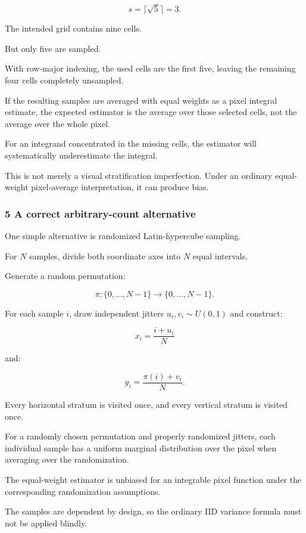\[
 s=\lceil\sqrt5\rceil=3.
\]

The intended grid contains nine cells.

But only five are sampled.

With row-major indexing, the used cells are the first five, leaving the remaining four cells completely unsampled.

If the resulting samples are averaged with equal weights as a pixel integral estimate, the expected estimator is the average over those selected cells, not the average over the whole pixel.

For an integrand concentrated in the missing cells, the estimator will systematically underestimate the integral.

This is not merely a visual stratification imperfection. Under an ordinary equal-weight pixel-average interpretation, it can produce bias.

\subsubsection{5 A correct arbitrary-count alternative}\label{02-foundations-ii-ch039-a-correct-arbitrary-count-alternative}

One simple alternative is randomized Latin-hypercube sampling.

For \(N\) samples, divide both coordinate axes into \(N\) equal intervals.

Generate a random permutation:

\[
 \pi:\{0,\ldots,N-1\}\rightarrow\{0,\ldots,N-1\}.
\]

For each sample \(i\), draw independent jitters \(u_i,v_i\sim U(0,1)\) and construct:

\[
 \boxed{ x_i=\frac{i+u_i}{N} }
\]

and:

\[
 \boxed{ y_i=\frac{\pi(i)+v_i}{N} }.
\]

Every horizontal stratum is visited once, and every vertical stratum is visited once.

For a randomly chosen permutation and properly randomized jitters, each individual sample has a uniform marginal distribution over the pixel when averaging over the randomization.

The equal-weight estimator is unbiased for an integrable pixel function under the corresponding randomization assumptions.

The samples are dependent by design, so the ordinary IID variance formula must not be applied blindly.

